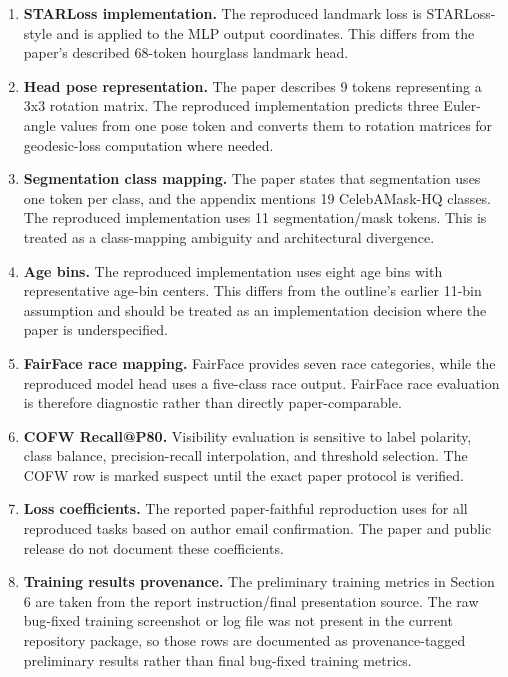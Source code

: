 \documentclass[11pt]{article}
\begin{document}
\begin{enumerate}[leftmargin=*]
\item \textbf{STARLoss implementation.} The reproduced landmark loss is STARLoss-style and is applied to the MLP output coordinates. This differs from the paper's described 68-token hourglass landmark head.

\item \textbf{Head pose representation.} The paper describes 9 tokens representing a 3x3 rotation matrix. The reproduced implementation predicts three Euler-angle values from one pose token and converts them to rotation matrices for geodesic-loss computation where needed.

\item \textbf{Segmentation class mapping.} The paper states that segmentation uses one token per class, and the appendix mentions 19 CelebAMask-HQ classes. The reproduced implementation uses 11 segmentation/mask tokens. This is treated as a class-mapping ambiguity and architectural divergence.

\item \textbf{Age bins.} The reproduced implementation uses eight age bins with representative age-bin centers. This differs from the outline's earlier 11-bin assumption and should be treated as an implementation decision where the paper is underspecified.

\item \textbf{FairFace race mapping.} FairFace provides seven race categories, while the reproduced model head uses a five-class race output. FairFace race evaluation is therefore diagnostic rather than directly paper-comparable.

\item \textbf{COFW Recall@P80.} Visibility evaluation is sensitive to label polarity, class balance, precision-recall interpolation, and threshold selection. The COFW row is marked suspect until the exact paper protocol is verified.

\item \textbf{Loss coefficients.} The reported paper-faithful reproduction uses  for all reproduced tasks based on author email confirmation. The paper and public release do not document these coefficients.

\item \textbf{Training results provenance.} The preliminary training metrics in Section 6 are taken from the report instruction/final presentation source. The raw bug-fixed training screenshot or log file was not present in the current repository package, so those rows are documented as provenance-tagged preliminary results rather than final bug-fixed training metrics.
\end{enumerate}
\end{document}
